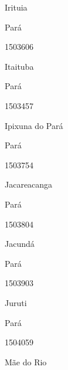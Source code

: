 \documentclass[
  letterpaper,
]{report}
\begin{document}
\n      

Irituia

\n    

\n    

\n      

Pará

\n      

1503606

\n      

Itaituba

\n    

\n    

\n      

Pará

\n      

1503457

\n      

Ipixuna do Pará

\n    

\n    

\n      

Pará

\n      

1503754

\n      

Jacareacanga

\n    

\n    

\n      

Pará

\n      

1503804

\n      

Jacundá

\n    

\n    

\n      

Pará

\n      

1503903

\n      

Juruti

\n    

\n    

\n      

Pará

\n      

1504059

\n      

Mãe do Rio

\n    

\n    

\n      
\end{document}
